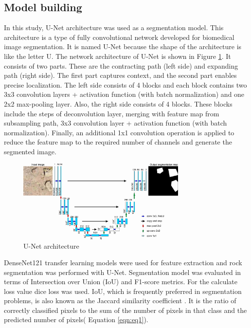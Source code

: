 \documentclass[a4paper,fleqn]{cas-sc}
\begin{document}
\subsection{Model building}
In this study, U-Net architecture \citep{ronneberger2015u} was used as a segmentation model. This architecture is a type of fully convolutional network developed for biomedical image segmentation. It is named U-Net because the shape of the architecture is like the letter U. The network architecture of U-Net is shown in Figure \ref{fig:Figure5}. It consists of two parts. These are the contracting path (left side) and expanding path (right side). The first part captures context, and the second part enables precise localization. The left side consists of 4 blocks and each block contains two 3x3 convolution layers + activation function (with batch normalization) and one 2x2 max-pooling layer. Also, the right side consists of 4 blocks. These blocks include the steps of deconvolution layer, merging with feature map from subsampling path, 3x3 convolution layer + activation function (with batch normalization). Finally, an additional 1x1 convolution operation is applied to reduce the feature map to the required number of channels and generate the segmented image.
\begin{figure}
	\centering
	\includegraphics[width=0.75\textwidth]{figures/fig5.jpg}
	\caption{U-Net architecture}
	\label{fig:Figure5}
\end{figure}

DenseNet121 transfer learning models were used for feature extraction and rock segmentation was performed with U-Net. Segmentation model was evaluated in terms of Intersection over Union (IoU) and F1-score metrics. For the calculate loss value dice loss was used. IoU, which is frequently preferred in segmentation problems, is also known as the Jaccard similarity coefficient \citep{jaccard1912distribution}. It is the ratio of correctly classified pixels to the sum of the number of pixels in that class and the predicted number of pixels( Equation \ref{eqn:eq1}). 
\end{document}
